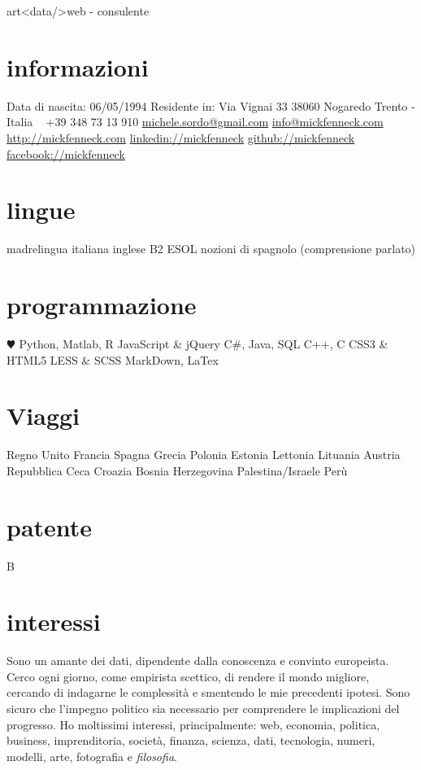 \documentclass[]{friggeri-cv}
\begin{document}
       {art<data/>web - consulente}


\begin{aside}
  \section{informazioni}
    Data di nascita:
    06/05/1994
    Residente in:
    Via Vignai 33
    38060 Nogaredo
    Trento - Italia
    ~
    +39 348 73 13 910
    \href{mailto:michele.sordo@gmail.com}{michele.sordo@gmail.com}
    \href{mailto:info@mickfenneck.com}{info@mickfenneck.com}
    \href{http://mickfenneck.com}{http://mickfenneck.com}
    \href{http://linkedin.com/in/mickfenneck}{linkedin://mickfenneck}
    \href{http://github.com/mickfenneck}{github://mickfenneck}
    \href{http://facebook.com/mickfenneck}{facebook://mickfenneck}
  \section{lingue}
    madrelingua italiana
    inglese B2 ESOL
    nozioni di spagnolo
    (comprensione parlato)
  \section{programmazione}
    {\color{red} $\varheartsuit$} Python,
    Matlab, R
    JavaScript \& jQuery
    C\#, Java, SQL
    C++, C
    CSS3 \& HTML5
    LESS \& SCSS
    MarkDown, LaTex
\section{Viaggi}
    Regno Unito
    Francia
    Spagna
    Grecia
    Polonia
    Estonia
    Lettonia
    Lituania
    Austria
    Repubblica Ceca
    Croazia
    Bosnia Herzegovina
    Palestina/Israele
    Perù
\section{patente}
    B
\end{aside}






\section{interessi}
Sono un amante dei dati, dipendente dalla conoscenza e convinto europeista. Cerco ogni giorno, come empirista scettico, di rendere il mondo migliore, cercando di indagarne le complessità e smentendo le mie precedenti ipotesi. Sono sicuro che l'impegno politico sia necessario per comprendere le implicazioni del progresso. Ho moltissimi interessi, principalmente: web, economia, politica, business, imprenditoria, società, finanza, scienza, dati, tecnologia, numeri, modelli, arte, fotografia e \emph{filosofia}.
\end{document}
